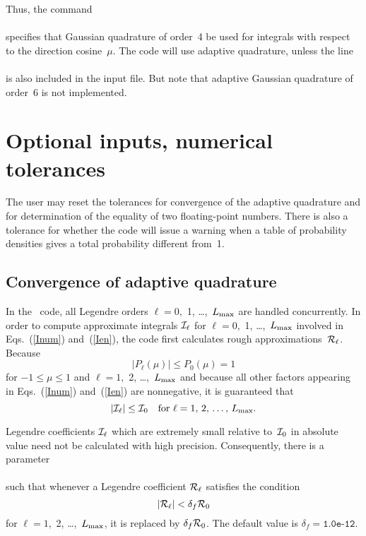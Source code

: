 Thus, the command\\
  \\
specifies that Gaussian quadrature of order~4 be used for integrals with
respect to the direction cosine~$\mu$.  The code will use adaptive quadrature,
unless the line\\
  \\
is also included in the input file.  But note that adaptive Gaussian quadrature 
of order~6 is not implemented.

\section{Optional inputs, numerical tolerances}
The user may reset the tolerances for convergence of the adaptive quadrature
and for determination of the equality of two floating-point numbers.  There is
also a tolerance for whether the code will issue a warning when a table of
probability densities gives a total probability different from~1.

\subsection{Convergence of adaptive quadrature}\label{Sec:adaptive-quadrature}
In the \gettransfer\ code, all Legendre
orders  $\ell = 0,$ 1, \ldots,~$L_{\text{max}}$ are handled concurrently.
In order to compute approximate integrals ${\cal I}_\ell$ for $\ell = 0,$ 1, \ldots,~$L_{\text{max}}$
involved in Eqs.~(\ref{Inum}) and~(\ref{Ien}),
the code first calculates rough approximations~${\cal R}_\ell$.  Because
$$
  |P_\ell ( \mu ) | \le P_0( \mu ) = 1
$$
for $-1 \le \mu \le 1$ and  $\ell = 1,$ 2, \ldots,~$L_{\text{max}}$ and because all other
factors appearing in Eqs.~(\ref{Inum}) and~(\ref{Ien}) are nonnegative, it is guaranteed
that
$$
  | {\cal I}_\ell | \le {\cal I}_0
  \quad \text{for $\ell = 1,$ 2, \ldots,~$L_{\text{max}}$.}
$$

Legendre coefficients ${\cal I}_\ell$ which are extremely small relative
to~${\cal I}_0$ in absolute value need not be calculated with high precision.
Consequently, there is a parameter\\
  \\
 such that
whenever a Legendre coefficient ${\cal R}_\ell$ satisfies the condition
$$
  | {\cal R}_\ell| < \delta_f {\cal R}_0
$$
for $\ell = 1,$ 2, \ldots,~$L_{\text{max}}$, it is replaced by $\delta_f {\cal R}_0$.
The default value is $\delta_f = \texttt{1.0e-12}$.

